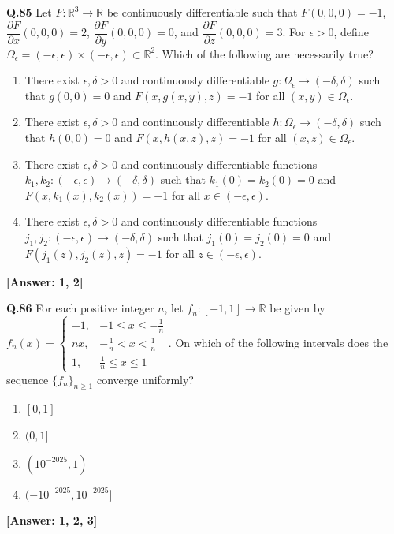 \documentclass[12pt,a4paper]{article}
\newcommand{\ans}[1]{\quad\textcolor{anscolor}{\textbf{[Answer: #1]}}}
\begin{document}
\textbf{Q.85} Let $F:\mathbb{R}^3\to\mathbb{R}$ be continuously differentiable such that $F(0,0,0)=-1$, $\dfrac{\partial F}{\partial x}(0,0,0)=2$, $\dfrac{\partial F}{\partial y}(0,0,0)=0$, and $\dfrac{\partial F}{\partial z}(0,0,0)=3$. For $\epsilon>0$, define $\Omega_\epsilon=(-\epsilon,\epsilon)\times(-\epsilon,\epsilon)\subset\mathbb{R}^2$. Which of the following are necessarily true?
\begin{enumerate}[label=\arabic*.]
\item There exist $\epsilon,\delta>0$ and continuously differentiable $g:\Omega_\epsilon\to(-\delta,\delta)$ such that $g(0,0)=0$ and $F(x,g(x,y),z)=-1$ for all $(x,y)\in\Omega_\epsilon$.
\item There exist $\epsilon,\delta>0$ and continuously differentiable $h:\Omega_\epsilon\to(-\delta,\delta)$ such that $h(0,0)=0$ and $F(x,h(x,z),z)=-1$ for all $(x,z)\in\Omega_\epsilon$.
\item There exist $\epsilon,\delta>0$ and continuously differentiable functions $k_1,k_2:(-\epsilon,\epsilon)\to(-\delta,\delta)$ such that $k_1(0)=k_2(0)=0$ and $F(x,k_1(x),k_2(x))=-1$ for all $x\in(-\epsilon,\epsilon)$.
\item There exist $\epsilon,\delta>0$ and continuously differentiable functions $j_1,j_2:(-\epsilon,\epsilon)\to(-\delta,\delta)$ such that $j_1(0)=j_2(0)=0$ and $F(j_1(z),j_2(z),z)=-1$ for all $z\in(-\epsilon,\epsilon)$.
\end{enumerate}\ans{1, 2}

\textbf{Q.86} For each positive integer $n$, let $f_n:[-1,1]\to\mathbb{R}$ be given by $f_n(x)=\begin{cases}-1,&-1\le x\le-\tfrac{1}{n}\\nx,&-\tfrac{1}{n}<x<\tfrac{1}{n}\\1,&\tfrac{1}{n}\le x\le1\end{cases}$. On which of the following intervals does the sequence $\{f_n\}_{n\ge1}$ converge uniformly?
\begin{enumerate}[label=\arabic*.]
\item $[0,1]$ \item $(0,1]$ \item $(10^{-2025},1)$ \item $(-10^{-2025},10^{-2025}]$
\end{enumerate}\ans{1, 2, 3}
\end{document}

